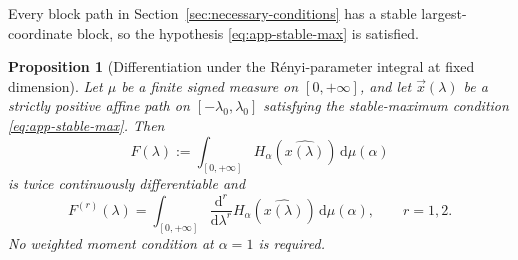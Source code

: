 \documentclass[aps,pra,11pt,onecolumn,nofootinbib,tightenlines]{revtex4-2}
\newtheorem{proposition}[theorem]{Proposition}
\theoremstyle{definition}
\begin{document}
Every block path in Section~\ref{sec:necessary-conditions} has a stable largest-coordinate block, so the hypothesis \eqref{eq:app-stable-max} is satisfied.

\begin{proposition}[Differentiation under the R\'enyi-parameter integral at fixed dimension]
\label{prop:app-fixed-d-interchange}
Let $\mu$ be a finite signed measure on $[0,+\infty]$, and let $\vec x(\lambda)$ be a strictly positive affine path on $[-\lambda_0,\lambda_0]$ satisfying the stable-maximum condition \eqref{eq:app-stable-max}.  Then
\begin{equation}
 F(\lambda):=
 \int_{[0,+\infty]}
 H_\alpha(\widehat{x(\lambda)})\,\mathrm d\mu(\alpha)
 \label{eq:app-F-lambda-integral}
\end{equation}
is twice continuously differentiable and
\begin{equation}
 F^{(r)}(\lambda)
 =\int_{[0,+\infty]}
 \frac{\mathrm d^r}{\mathrm d\lambda^r}
 H_\alpha(\widehat{x(\lambda)})\,\mathrm d\mu(\alpha),
 \qquad r=1,2.
 \label{eq:app-fixed-d-interchange-final}
\end{equation}
No weighted moment condition at $\alpha=1$ is required.
\end{proposition}
\end{document}
